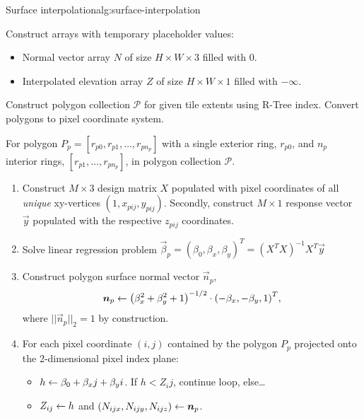 \begin{algorithm}{Surface interpolation}{alg:surface-interpolation}
\item Construct arrays with temporary placeholder values:
  \begin{itemize}[label=--,leftmargin=0cm]
    \item Normal vector array $N$ of size $H \times W \times 3$ filled with $0$.
    \item Interpolated elevation array $Z$ of size $H \times W \times 1$ filled with $-\infty$.
  \end{itemize}
\item Construct polygon collection $\mathcal{P}$ for given tile extents using R-Tree index.
  Convert polygons to pixel coordinate system.
\item For polygon $P_p = [r_{p0}, r_{p1}, \dots, r_{pn_p}]$ with a single exterior ring, $r_{p0}$, and $n_p$ interior rings, $[r_{p1}, \ldots, r_{pn_p}]$, in polygon collection $\mathcal{P}$.
  \begin{enumerate}[leftmargin=0.5em,label=\textbf{\textcolor{gray}{\alph*}}]
    \item Construct $M \times 3$ design matrix $X$ populated with pixel coordinates of all \textit{unique} xy-vertices $(1, x_{pij}, y_{pij})$.
        Secondly, construct $M \times 1$ response vector $\vec{y}$ populated with the respective $z_{pij}$ coordinates.
    \item Solve linear regression problem $\vec{\beta}_p = {\left(\beta_0, \beta_x, \beta_y\right)}^T = {\left(X^T X\right)}^{-1} X^T \vec{y}$
    \item Construct polygon surface normal vector $\vec{n}_p$,
      \begin{equation*}
        \boldsymbol{n}_p \leftarrow {\left(\beta_x^2 + \beta_y^2 + 1\right)}^{-1/2} \cdot {\left(-\beta_x, -\beta_y, 1\right)}^T,
      \end{equation*}
      where $||\vec{n}_p||_2 = 1$ by construction.
    \item For each pixel coordinate $(i, j)$ contained by the polygon $P_p$ projected onto the 2-dimensional pixel index plane:
      \begin{itemize}[leftmargin=0.5em]
        \item $h \leftarrow \beta_0 + \beta_x j + \beta_y i$. If $h < Z_ij$, continue loop, else\dots
        \item $Z_{ij} \leftarrow h$ and $\left(N_{ijx}, N_{ijy}, N_{ijz}\right) \leftarrow \boldsymbol{n}_p$.
      \end{itemize}
    \end{enumerate}
\end{algorithm}
